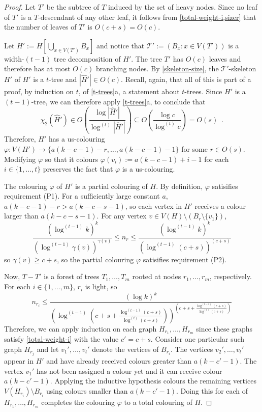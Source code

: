 \documentclass[kpfonts]{patmorin}
\newcommand{\uqs}{\chi_2}
\theoremstyle{named}
\newcommand{\weirdref}[2]{\cref{#1}#2}
\begin{document}
\begin{proof}
    Let $T'$ be the subtree of $T$ induced by the set of heavy nodes.  Since no leaf of $T'$ is a $T$-descendant of any other leaf, it follows from \cref{total-weight-i,sizer} that the number of leaves of $T'$ is $O(c+s)=O(c)$.

    Let $H':=H[\bigcup_{x\in V(T')} B_x]$ and notice that $\mathcal{T}':=(B_x:x\in V(T'))$ is a width-$(t-1)$ tree decomposition of $H'$. The tree $T'$ has $O(c)$ leaves and therefore has at most $O(c)$ branching nodes. By \cref{skeleton-size}, the $\mathcal{T}'$-skeleton $\hat{H'}$ of $H'$ is a $t$-tree and $|\hat{H}'|\in O(c)$.  Recall, again, that all of this is part of a proof, by induction on $t$, of \weirdref{t-trees}{a}, a statement about $t$-trees.  Since $H'$ is a $(t-1)$-tree, we can therefore apply \weirdref{t-trees}{a}, to conclude that
    \[
       \uqs(\hat{H}')\in
       O\left(\frac{\log|\hat{H}'|}{\log^{(t)}|\hat{H}'|}\right)
       \subseteq O\left(\frac{\log c}{\log^{(t)} c}\right) = O(s) \enspace .
    \]
    Therefore, $H'$ has a us-colouring $\varphi:V(H')\to \{a(k-c-1)-r,\ldots,a(k-c-1)-1\}$ for some $r\in O(s)$. Modifying $\varphi$ so that it colours $\varphi(v_i):=a(k-c-1)+i-1$ for each $i\in\{1,\ldots,t\}$ preserves the fact that $\varphi$ is a us-colouring.

    The colouring $\varphi$ of $H'$ is a partial colouring of $H$. By definition, $\varphi$ satisifies requirement (P1). For a sufficiently large constant $a$, $a(k-c-1)-r > a(k-c-s-1)$, so each vertex in $H'$ receives a colour larger than $a(k-c-s-1)$.  For any vertex $v\in V(H)\setminus (B_r\setminus \{v_1\})$,
    \[ \frac{(\log^{(t-1)} k)^k}{(\log^{(t-1)}\gamma(v))^{\gamma(v)}}
         \le n_r
         \le \frac{(\log^{(t-1)} k)^k}{(\log^{(t-1)}(c+s))^{(c+s)}}
    \]
    so $\gamma(v)\ge c+s$, so the partial colouring $\varphi$ satisifies requirement (P2).

   Now, $T-T'$ is a forest of trees $T_1,\ldots,T_m$ rooted at nodes $r_1,\ldots,r_m$, respectively.
   For each $i\in\{1,\ldots,m\}$, $r_i$ is light, so
   \[
       n_{r_i} \le \frac{(\log k)^k}{
        \left(
            \log^{(t-1)}
                \left(
                   c+s+\tfrac{\log^{(t-1)} (c+s)}{\log^{(t)}(c+s)}
               \right)
        \right)^{\left(
           c+s+\tfrac{\log^{(t-1)} (c+s)}{\log^{(t)}(c+s)}
       \right)}
       }
   \]
   Therefore, we can apply induction on each graph $H_{r_1},\ldots,H_{r_m}$ since these graphs satisfy \cref{total-weight-i} with the value $c'=c+s$.
   Consider one particular such graph $H_{r_j}$ and let $v_1',\ldots,v_t'$ denote the vertices of $B_{r_i}$.  The vertices $v_2',\ldots,v_t'$ appear in $H'$ and have already received colours greater than $a(k-c'-1)$.  The vertex $v_1'$ has not been assigned a colour yet and it can receive colour $a(k-c'-1)$.  Applying the inductive hypothesis colours the remaining vertices $V(H_{r_i})\setminus B_{r_i}$ using colours smaller than $a(k-c'-1)$.  Doing this for each of $H_{r_1},\ldots,H_{r_m}$ completes the colouring $\varphi$ to a total colouring of $H$.


\end{proof}
\end{document}
